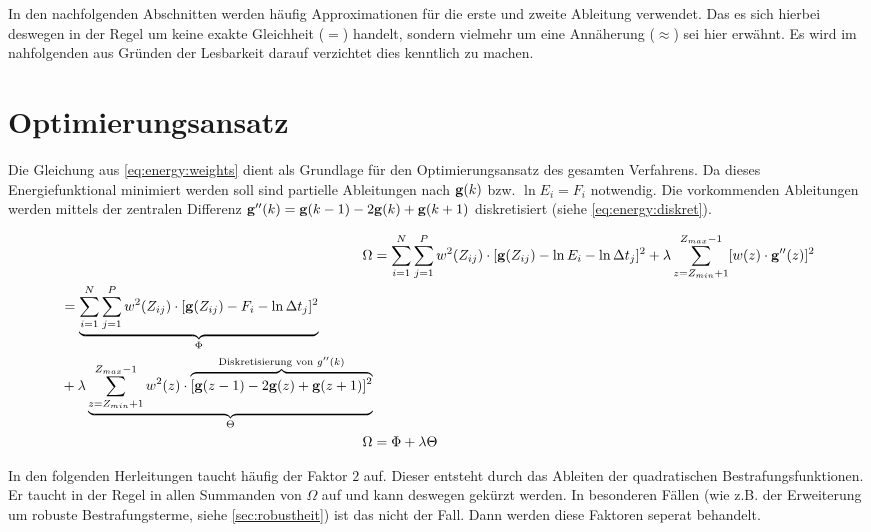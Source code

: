 In den nachfolgenden Abschnitten werden häufig Approximationen für die erste und zweite Ableitung verwendet. Das es sich hierbei deswegen in der Regel um keine exakte Gleichheit ($=$) handelt, sondern vielmehr um eine Annäherung ($\approx$) sei hier erwähnt. Es wird im nahfolgenden aus Gründen der Lesbarkeit darauf verzichtet dies kenntlich zu machen.


\section{Optimierungsansatz}
\label{sec:ansatz}
Die Gleichung aus \autoref{eq:energy:weights} dient als Grundlage für den Optimierungsansatz des gesamten Verfahrens. Da dieses Energiefunktional minimiert werden soll sind partielle Ableitungen nach $\mathbf g(k)$ bzw. $\ln E_i = F_i$ notwendig. Die vorkommenden Ableitungen werden mittels der zentralen Differenz $\mathbf g''(k) = \mathbf g(k-1) - 2\mathbf g(k) +\mathbf g(k+1)$ diskretisiert (siehe \autoref{eq:energy:diskret}).

\begin{align}
\Omega &= \sum \limits_{i=1}^{N} \sum \limits_{j=1}^{P}w^2(Z_{ij})\cdot[\mathbf g(Z_{ij}) - \ln E_i - \ln \Delta t_j]^2 + \lambda  \sum \limits_{z=Z_{min}+1}^{Z_{max}-1} [w(z) \cdot \mathbf g''(z)]^2\\
\label{eq:energy:diskret}
\begin{split}
 &= \underbrace{\sum \limits_{i=1}^{N} \sum \limits_{j=1}^{P}w^2(Z_{ij})\cdot[\mathbf g(Z_{ij}) - F_i - \ln \Delta t_j]^2}_{\Phi} \\
 &+ \lambda \underbrace{ \sum \limits_{z=Z_{min}+1}^{Z_{max}-1} w^2(z) \cdot \overbrace{
 	[\mathbf g(z-1)-2\mathbf g(z)+\mathbf g(z+1)]^2
 }^{
 	\text{Diskretisierung von }g''(k)
 }
 }_{\Theta}
 \end{split}\\
 \Omega &= \Phi + \lambda \Theta
\end{align}

In den folgenden Herleitungen taucht häufig der Faktor $2$ auf. Dieser entsteht durch das Ableiten der quadratischen Bestrafungsfunktionen. Er taucht in der Regel in allen Summanden von $\Omega$ auf und kann deswegen gekürzt werden. In besonderen Fällen (wie z.B. der Erweiterung um robuste Bestrafungsterme, siehe \autoref{sec:robustheit}) ist das nicht der Fall. Dann werden diese Faktoren seperat behandelt.

